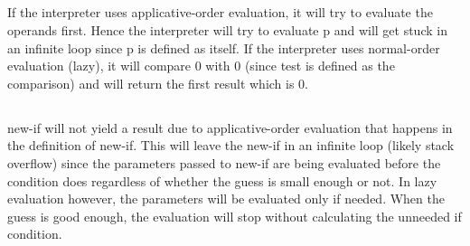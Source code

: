 \documentclass{article}
\begin{document}
\subsection{}
If the interpreter uses applicative-order evaluation, it will try to evaluate the operands first. Hence the interpreter will try to evaluate p and will get stuck in an infinite loop since p is defined as itself.
If the interpreter uses normal-order evaluation (lazy), it will compare 0 with 0 (since test is defined as the comparison) and will return the first result which is 0.

\subsection{}
new-if will not yield a result due to applicative-order evaluation that happens in the definition of new-if. This will leave the new-if in an infinite loop (likely stack overflow) since the parameters passed to new-if are being evaluated before the condition does regardless of whether the guess is small enough or not. In lazy evaluation however, the parameters will be evaluated only if needed. When the guess is good enough, the evaluation will stop without calculating the unneeded if condition.

\subsection{}
\end{document}
